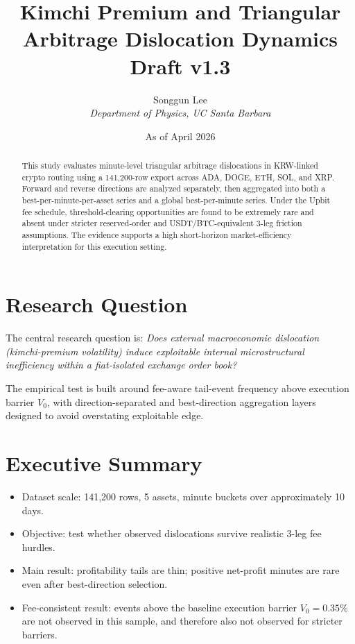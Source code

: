 \documentclass[11pt,a4paper]{article}
\title{\textbf{Kimchi Premium and Triangular Arbitrage Dislocation Dynamics}\\Draft v1.3}
\author{Songgun Lee \\ \textit{Department of Physics, UC Santa Barbara}}
\date{As of April 2026}
\begin{document}
\maketitle
\begin{abstract}
This study evaluates minute-level triangular arbitrage dislocations in KRW-linked crypto routing using a 141,200-row export across ADA, DOGE, ETH, SOL, and XRP. Forward and reverse directions are analyzed separately, then aggregated into both a best-per-minute-per-asset series and a global best-per-minute series. Under the Upbit fee schedule, threshold-clearing opportunities are found to be extremely rare and absent under stricter reserved-order and USDT/BTC-equivalent 3-leg friction assumptions. The evidence supports a high short-horizon market-efficiency interpretation for this execution setting.
\end{abstract}
\tableofcontents
\newpage

\section{Research Question}
The central research question is: \emph{Does external macroeconomic dislocation (kimchi-premium volatility) induce exploitable internal microstructural inefficiency within a fiat-isolated exchange order book?}

\noindent
The empirical test is built around fee-aware tail-event frequency above execution barrier $V_0$, with direction-separated and best-direction aggregation layers designed to avoid overstating exploitable edge.

\section{Executive Summary}
\begin{itemize}
    \item Dataset scale: 141,200 rows, 5 assets, minute buckets over approximately 10 days.
    \item Objective: test whether observed dislocations survive realistic 3-leg fee hurdles.
    \item Main result: profitability tails are thin; positive net-profit minutes are rare even after best-direction selection.
    \item Fee-consistent result: events above the baseline execution barrier $V_0=0.35\%$ are not observed in this sample, and therefore also not observed for stricter barriers.
\end{itemize}
\end{document}
